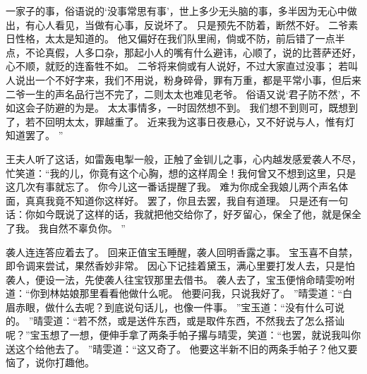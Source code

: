 一家子的事，俗语说的‘没事常思有事’，世上多少无头脑的事，多半因为无心中做出，有心人看见，当做有心事，反说坏了。
只是预先不防着，断然不好。
二爷素日性格，太太是知道的。
他又偏好在我们队里闹，倘或不防，前后错了一点半点，不论真假，人多口杂，那起小人的嘴有什么避讳，心顺了，说的比菩萨还好，心不顺，就贬的连畜牲不如。
二爷将来倘或有人说好，不过大家直过没事；
若叫人说出一个不好字来，我们不用说，粉身碎骨，罪有万重，都是平常小事，但后来二爷一生的声名品行岂不完了，二则太太也难见老爷。
俗语又说‘君子防不然’，不如这会子防避的为是。
太太事情多，一时固然想不到。
我们想不到则可，既想到了，若不回明太太，罪越重了。
近来我为这事日夜悬心，又不好说与人，惟有灯知道罢了。
”
\par
王夫人听了这话，如雷轰电掣一般，正触了金钏儿之事，心内越发感爱袭人不尽，忙笑道：“我的儿，你竟有这个心胸，想的这样周全！我何曾又不想到这里，只是这几次有事就忘了。
你今儿这一番话提醒了我。
难为你成全我娘儿两个声名体面，真真我竟不知道你这样好。
罢了，你且去罢，我自有道理。
只是还有一句话：你如今既说了这样的话，我就把他交给你了，好歹留心，保全了他，就是保全了我。
我自然不辜负你。
”\par
袭人连连答应着去了。
回来正值宝玉睡醒，袭人回明香露之事。
宝玉喜不自禁，即令调来尝试，果然香妙非常。
因心下记挂着黛玉，满心里要打发人去，只是怕袭人，便设一法，先使袭人往宝钗那里去借书。
袭人去了，宝玉便悄命晴雯吩咐道：“你到林姑娘那里看看他做什么呢。
他要问我，只说我好了。
”晴雯道：“白眉赤眼，做什么去呢？到底说句话儿，也像一件事。
”宝玉道：“没有什么可说的。
”晴雯道：“若不然，或是送件东西，或是取件东西，不然我去了怎么搭讪呢？”宝玉想了一想，便伸手拿了两条手帕子撂与晴雯，笑道：“也罢，就说我叫你送这个给他去了。
”晴雯道：“这又奇了。
他要这半新不旧的两条手帕子？他又要恼了，说你打趣他。
